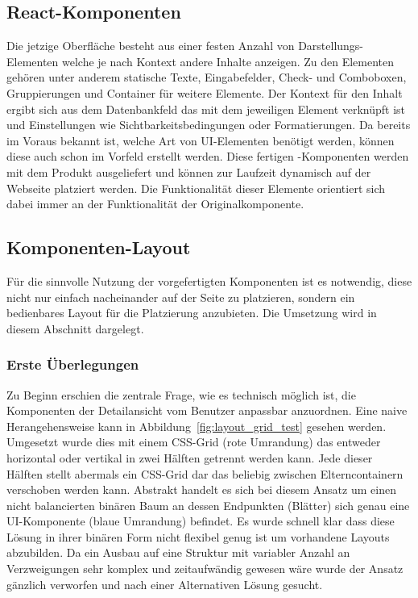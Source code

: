 \subsection{React-Komponenten}
Die jetzige Oberfläche besteht aus einer festen Anzahl von Darstellungs-Elementen welche je nach Kontext andere Inhalte anzeigen. Zu den Elementen gehören unter anderem statische Texte, Eingabefelder, Check- und Comboboxen, Gruppierungen und Container für weitere Elemente. Der Kontext für den Inhalt ergibt sich aus dem Datenbankfeld das mit dem jeweiligen Element verknüpft ist und Einstellungen wie Sichtbarkeitsbedingungen oder Formatierungen. Da bereits im Voraus bekannt ist, welche Art von UI-Elementen benötigt werden, können diese auch schon im Vorfeld erstellt werden. Diese fertigen -Komponenten werden mit dem Produkt ausgeliefert und können zur Laufzeit dynamisch auf der Webseite platziert werden. Die Funktionalität dieser Elemente orientiert sich dabei immer an der Funktionalität der Originalkomponente.

\subsection{Komponenten-Layout}
Für die sinnvolle Nutzung der vorgefertigten Komponenten ist es notwendig, diese nicht nur einfach nacheinander auf der Seite zu platzieren, sondern ein bedienbares Layout für die Platzierung anzubieten. Die Umsetzung wird in diesem Abschnitt dargelegt.

\subsubsection{Erste Überlegungen}
Zu Beginn erschien die zentrale Frage, wie es technisch möglich ist, die Komponenten der Detailansicht vom Benutzer anpassbar anzuordnen. Eine naive Herangehensweise kann in Abbildung~\ref{fig:layout_grid_test} gesehen werden. Umgesetzt wurde dies mit einem CSS-Grid (rote Umrandung) das entweder horizontal oder vertikal in zwei Hälften getrennt werden kann. Jede dieser Hälften stellt abermals ein CSS-Grid dar das beliebig zwischen Elterncontainern verschoben werden kann. Abstrakt handelt es sich bei diesem Ansatz um einen nicht balancierten binären Baum an dessen Endpunkten (Blätter) sich genau eine UI-Komponente (blaue Umrandung) befindet. Es wurde schnell klar dass diese Lösung in ihrer binären Form nicht flexibel genug ist um vorhandene Layouts abzubilden. Da ein Ausbau auf eine Struktur mit variabler Anzahl an Verzweigungen sehr komplex und zeitaufwändig gewesen wäre wurde der Ansatz gänzlich verworfen und nach einer Alternativen Lösung gesucht. 

